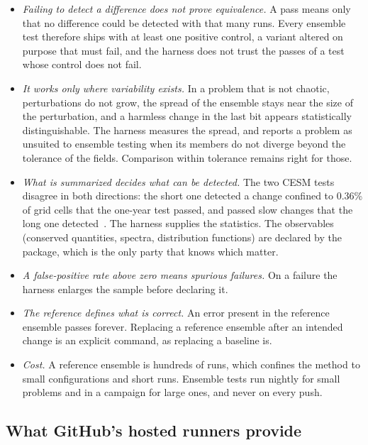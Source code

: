 \documentclass[11pt,a4paper]{article}
\begin{document}
\begin{itemize}
  \item \emph{Failing to detect a difference does not prove equivalence.}
        A pass means only that no difference could be detected with that
        many runs.  Every ensemble test therefore ships with at least one
        positive control, a variant altered on purpose that must fail, and
        the harness does not trust the passes of a test whose control does
        not fail.
  \item \emph{It works only where variability exists.}  In a problem that is
        not chaotic, perturbations do not grow, the spread of the ensemble
        stays near the size of the perturbation, and a harmless change in
        the last bit appears statistically distinguishable.  The harness
        measures the spread, and reports a problem as unsuited to ensemble
        testing when its members do not diverge beyond the tolerance of the
        fields.  Comparison within tolerance remains right for those.
  \item \emph{What is summarized decides what can be detected.}  The two
        CESM tests disagree in both directions: the short one detected a
        change confined to 0.36\% of grid cells that the one-year test
        passed, and passed slow changes that the long one
        detected~\cite{ufcamect}.  The harness supplies the statistics.
        The observables (conserved quantities, spectra, distribution
        functions) are declared by the package, which is the only party
        that knows which matter.
  \item \emph{A false-positive rate above zero means spurious failures.}
        On a failure the harness enlarges the sample before declaring it.
  \item \emph{The reference defines what is correct.}  An error present in
        the reference ensemble passes forever.  Replacing a reference
        ensemble after an intended change is an explicit command, as
        replacing a baseline is.
  \item \emph{Cost.}  A reference ensemble is hundreds of runs, which
        confines the method to small configurations and short runs.
        Ensemble tests run nightly for small problems and in a campaign for
        large ones, and never on every push.
\end{itemize}

\subsection{What GitHub's hosted runners provide}
\end{document}
